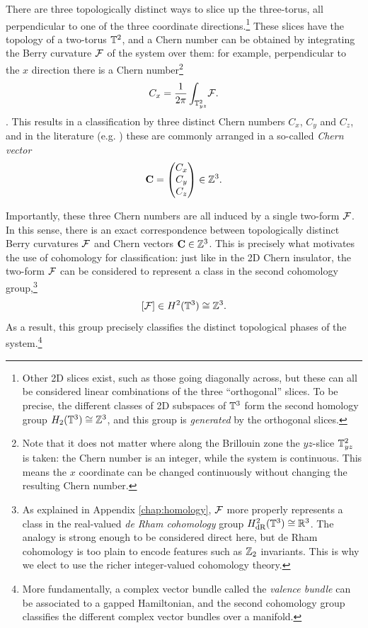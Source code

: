 There are three topologically distinct ways to slice up the three-torus, all perpendicular to one of the three coordinate directions.\footnote{
	Other 2D slices exist, such as those going diagonally across, but these can all be considered linear combinations of the three ``orthogonal'' slices. To be precise, the different classes of 2D subspaces of $\mathbb{T}^3$ form the second homology group $H_2(\mathbb{T}^3)\cong\mathbb{Z}^3$, and this group is \emph{generated} by the orthogonal slices.}
These slices have the topology of a two-torus $\mathbb{T}^2$, and a Chern number can be obtained by integrating the Berry curvature $\mathcal{F}$ of the system over them: for example, perpendicular to the $x$ direction there is a Chern number\footnote{
	Note that it does not matter where along the Brillouin zone the $yz$-slice $\mathbb{T}_{yz}^2$ is taken: the Chern number is an integer, while the system is continuous. This means the $x$ coordinate can be changed continuously without changing the resulting Chern number.}
\begin{equation*}
	C_{x} = \frac{1}{2\pi}\int_{\mathbb{T}_{yz}^2}\!\mathcal{F}.
\end{equation*}.
This results in a classification by three distinct Chern numbers $C_x$, $C_y$ and $C_z$, and in the literature (e.g. \cites{Vanderbilt_2018}{Liu_photonic-Chern-vector}) these are commonly arranged in a so-called \emph{Chern vector}
\[
	\vb{C} = \begin{pmatrix}
		C_x \\ C_y \\ C_z
	\end{pmatrix} \in \mathbb{Z}^3.
\]

Importantly, these three Chern numbers are all induced by a single two-form $\mathcal{F}$. In this sense, there is an exact correspondence between topologically distinct Berry curvatures $\mathcal{F}$ and Chern vectors $\vb{C}\in\mathbb{Z}^3$. This is precisely what motivates the use of cohomology for classification: just like in the 2D Chern insulator, the two-form $\mathcal{F}$ can be considered to represent a class in the second cohomology group,\footnote{
	As explained in Appendix \ref{chap:homology}, $\mathcal{F}$ more properly represents a class in the real-valued \emph{de Rham cohomology} group $H_{\rm dR}^2(\mathbb{T}^3)\cong\mathbb{R}^3$. The analogy is strong enough to be considered direct here, but de Rham cohomology is too plain to encode features such as $\mathbb{Z}_2$ invariants. This is why we elect to use the richer integer-valued cohomology theory.} %
\begin{equation}\label{eq:2nd-cohom-t3}
	[\mathcal{F}]\in H^2(\mathbb{T}^3)\cong\mathbb{Z}^3. 
\end{equation}
As a result, this group precisely classifies the distinct topological phases of the system.\footnote{
	More fundamentally, a complex vector bundle called the \emph{valence bundle} can be associated to a gapped Hamiltonian, and the second cohomology group classifies the different complex vector bundles over a manifold.} %

